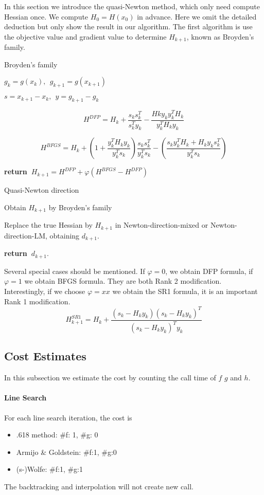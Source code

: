 \documentclass{article}
\newcommand{\return}{\textbf{return~}}
\begin{document}
In this section we introduce the quasi-Newton method, which only need compute Hessian once. We compute $H_0 = H(x_0)$ in advance. Here we omit the detailed deduction but only show the result in our algorithm. The first algorithm is use the objective value and gradient value to determine $H_{k+1}$, known as Broyden's family.

\begin{algorithm}
	\DontPrintSemicolon
	\caption{Broyden's family}
	$g_k = g(x_k),~~ g_{k+1} = g(x_{k+1})$
	
	$s = x_{k+1} - x_k, ~~ y = g_{k+1} - g_k$
	
	
	
	$$H^{DFP} = H_k + \frac{s_ks_k^T}{s_k^Ty_k} - \frac{Hky_ky_k^TH_k}{y_k^TH_ky_k}$$
	
	$$H^{BFGS} = H_k + (1+\frac{y_k^TH_ky_k}{y_k^Ts_k})\frac{s_ks_k^T}{y_k^Ts_k} - (\frac{s_ky_k^TH_k + H_ky_ks_k^T}{y_k^Ts_k})$$
	
	\return $H_{k+1} = H^{DFP} + \varphi(H^{BFGS} - H^{DFP})$
\end{algorithm}

\begin{algorithm}
	\DontPrintSemicolon
	\caption{Quasi-Newton direction}
	
	Obtain $H_{k+1}$ by Broyden's family
	
	Replace the true Hessian by $H_{k+1}$ in Newton-direction-mixed or Newton-direction-LM, obtaining $d_{k+1}$.
	
	\return $d_{k+1}$.

\end{algorithm}

Several special cases should be mentioned. If $\varphi = 0$, we obtain DFP formula, if $\varphi = 1$ we obtain BFGS formula. They are both Rank 2 modification. Interestingly, if we choose $\varphi = xx$ we obtain the SR1 formula, it is an important Rank 1 modification. 
$$H_{k+1}^{SR1} = H_k + \frac{(s_k - H_ky_k)(s_k - H_ky_k)^T}{(s_k - H_ky_k)^Ty_k}$$

\subsection{Cost Estimates}
In this subsection we estimate the cost by counting the call time of $f$ $g$ and $h$.
\paragraph{Line Search}
For each line search iteration, the cost is 
\begin{itemize}
	\item .618 method: \#f: 1, \#g: 0
	\item Armijo \& Goldstein: \#f:1, \#g:0
	\item (s-)Wolfe: \#f:1, \#g:1
\end{itemize}
The backtracking and interpolation will not create new call. 
\end{document}
